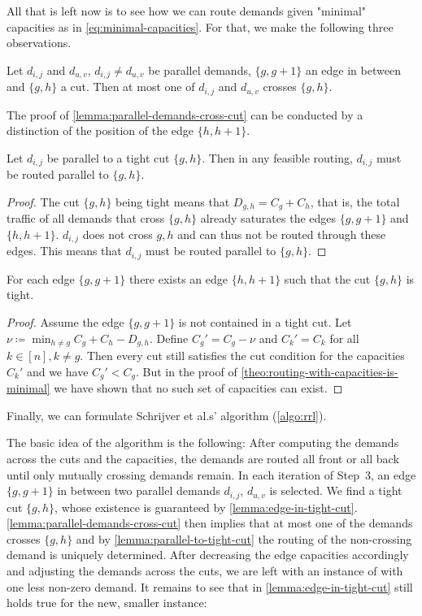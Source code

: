 All that is left now is to see how we can route demands given "minimal" capacities as in \cref{eq:minimal-capacities}.
For that, we make the following three observations.
\begin{lemma}
	\label{lemma:parallel-demands-cross-cut}
	Let $d_{i ,j}$ and $d_{u, v}$, $d_{i, j} \neq d_{u, v}$ be parallel demands, $\{g, g+1\}$ an edge in between and $\{g, h\}$ a cut.
	Then at most one of $d_{i ,j}$ and $d_{u, v}$ crosses $\{g, h\}$.
\end{lemma}
The proof of \cref{lemma:parallel-demands-cross-cut} can be conducted by a distinction of the position of the edge $\{h, h+1\}$.
\begin{lemma}
	\label{lemma:parallel-to-tight-cut}
	Let $d_{i, j}$ be parallel to a tight cut $\{g, h\}$.
	Then in any feasible routing, $d_{i, j}$ must be routed parallel to $\{g, h\}$.
\end{lemma}
\begin{proof}
	The cut $\{g, h\}$ being tight means that $D_{g, h} = C_g + C_h$, that is, the total traffic of all demands that cross $\{g, h\}$ already saturates the edges $\{g,g+1\}$ and $\{h, h+1\}$.
	$d_{i, j}$ does not cross ${g, h}$ and can thus not be routed through these edges.
	This means that $d_{i ,j}$ must be routed parallel to $\{g, h\}$.
\end{proof}
\begin{lemma}
	\label{lemma:edge-in-tight-cut}
	For each edge $\{g, g+1\}$ there exists an edge $\{h, h+1\}$ such that the cut $\{g, h\}$ is tight.
\end{lemma}
\begin{proof}
	Assume the edge $\{g, g+1\}$ is not contained in a tight cut.
	Let $\nu \coloneqq \min_{h \neq g} C_g + C_h - D_{g, h}$.
	Define $C_g' = C_g - \nu$ and $C_k' = C_k$ for all $k \in [n], k \neq g$.
	Then every cut still satisfies the cut condition for the capacities $C_k'$ and we have $C_g' < C_g$.
	But in the proof of \cref{theo:routing-with-capacities-is-minimal} we have shown that no such set of capacities can exist.
\end{proof}

Finally, we can formulate Schrijver et al.s' \cite{schrijver99} algorithm (\cref{algo:rrl}).


The basic idea of the algorithm is the following:
After computing the demands across the cuts and the capacities, the demands are routed all front or all back until only mutually crossing demands remain.
In each iteration of Step~3, an edge $\{g, g+1\}$ in between two parallel demands $d_{i, j}$, $d_{u, v}$ is selected.
We find a tight cut $\{g, h\}$, whose existence is guaranteed by \cref{lemma:edge-in-tight-cut}.
\cref{lemma:parallel-demands-cross-cut} then implies that at most one of the demands crosses $\{g, h\}$ and  by \cref{lemma:parallel-to-tight-cut} the routing of the non-crossing demand is uniquely determined.
After decreasing the edge capacities accordingly and adjusting the demands across the cuts, we are left with an instance of \RRLWC with one less non-zero demand.
It remains to see that in \cref{lemma:edge-in-tight-cut} still holds true for the new, smaller instance:

